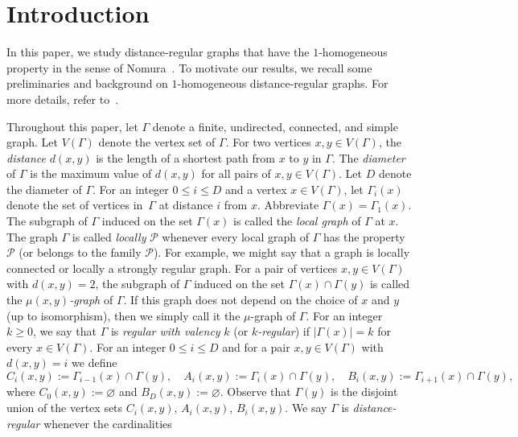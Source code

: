 \section{Introduction}
In this paper, we study distance-regular graphs that have the $1$-homogeneous property in the sense of Nomura~\cite{Nomura1994}.
To motivate our results, we recall some preliminaries and background on $1$-homogeneous distance-regular graphs. 
For more details, refer to~\cite{BCN, DaKoTa, Nomura1994}.

Throughout this paper, let $\Gamma$ denote a finite, undirected, connected, and simple graph. 
Let $V(\Gamma)$ denote the vertex set of $\Gamma$.
For two vertices $x,y \in V(\Gamma)$, the \emph{distance} $d(x,y)$ is the length of a shortest path from $x$ to $y$ in $\Gamma$.
The \emph{diameter} of $\Gamma$ is the maximum value of $d(x,y)$ for all pairs of $x,y \in V(\Gamma)$.
Let $D$ denote the diameter of $\Gamma$.
For an integer $0\leqslant i \leqslant D$ and a vertex $x \in V(\Gamma)$, let $\Gamma_i(x)$ denote the set of vertices in~$\Gamma$ at distance $i$ from $x$.
Abbreviate $\Gamma(x)=\Gamma_1(x)$.
The subgraph of $\Gamma$ induced on the set $\Gamma(x)$ is called the \emph{local graph} of $\Gamma$ at $x$.
The graph $\Gamma$ is called \emph{locally} $\mathcal{P}$ whenever every local graph of $\Gamma$ has the property $\mathcal{P}$ (or belongs to the family $\mathcal{P}$).
For example, we might say that a graph is locally connected or locally a strongly regular graph.
For a pair of vertices $x,y \in V(\Gamma)$ with $d(x,y)=2$, the subgraph of $\Gamma$ induced on the set $\Gamma(x)\cap \Gamma(y)$ is called the \emph{$\mu(x,y)$-graph} of $\Gamma$. 
If this graph does not depend on the choice of $x$ and $y$ (up to isomorphism), then we simply call it the $\mu$-graph of $\Gamma$.
For an integer $k\geqslant 0$, we say that $\Gamma$ is \emph{regular with valency} $k$ (or \emph{$k$-regular}) if $|\Gamma(x)|=k$ for every $x\in V(\Gamma)$. 
For an integer $0\leqslant i \leqslant D$ and for a pair $x, y \in V(\Gamma)$ with $d(x,y)=i$ we define 
\begin{equation}\label{sets:CAB}
	C_i(x,y) := \Gamma_{i-1}(x) \cap \Gamma(y), \quad 
	A_i(x,y) := \Gamma_{i}(x) \cap \Gamma(y), \quad 
	B_i(x,y) :=\Gamma_{i+1}(x) \cap \Gamma(y),
\end{equation}
where $C_{0}(x,y):= \varnothing$ and $B_{D}(x,y):=\varnothing$.
Observe that $\Gamma(y)$ is the disjoint union of the vertex sets $C_i(x,y)$, $A_i(x,y)$, $B_i(x,y)$.
We say $\Gamma$ is \emph{distance-regular} whenever the cardinalities 
